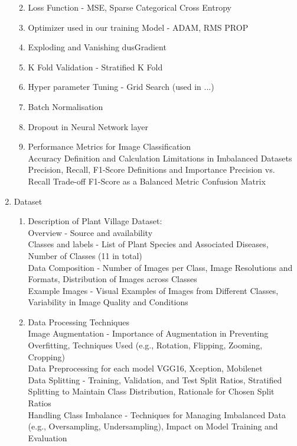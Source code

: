 \begin{enumerate}
\begin{enumerate}
\begin{enumerate}
               \end{enumerate} 
            \item Loss Function - MSE, Sparse Categorical Cross Entropy
            \item Optimizer used in our training Model - ADAM, RMS PROP
            \item Exploding and Vanishing dusGradient 
            \item K Fold Validation - Stratified K Fold
            \item Hyper parameter Tuning - Grid Search (used in ...)
            \item Batch Normalisation
            \item Dropout in Neural Network layer
            \item Performance Metrics for Image Classification\\                
                Accuracy
                Definition and Calculation
                Limitations in Imbalanced Datasets
                Precision, Recall, F1-Score
                Definitions and Importance
                Precision vs. Recall Trade-off
                F1-Score as a Balanced Metric
                Confusion Matrix

        \end{enumerate}
    \item Dataset
    \begin{enumerate}
            \item Description of Plant Village Dataset: \\
            Overview - Source and availability\\
            Classes and labels - List of Plant Species and Associated Diseases, Number of Classes (11 in total)\\
            Data Composition - Number of Images per Class, Image Resolutions and Formats, Distribution of Images across Classes\\
            Example Images - Visual Examples of Images from Different Classes, Variability in Image Quality and Conditions
            \item Data Processing Techniques \\
            Image Augmentation - Importance of Augmentation in Preventing Overfitting, Techniques Used (e.g., Rotation, Flipping, Zooming, Cropping)\\
            Data Preprocessing for each model VGG16, Xception, Mobilenet\\
            Data Splitting - Training, Validation, and Test Split Ratios, Stratified Splitting to Maintain Class Distribution, Rationale for Chosen Split Ratios\\
            Handling Class Imbalance - Techniques for Managing Imbalanced Data (e.g., Oversampling, Undersampling), Impact on Model Training and Evaluation
        

\end{enumerate}
\end{enumerate}
